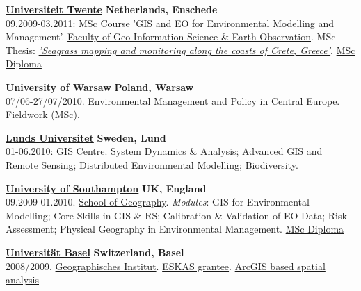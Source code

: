 \documentclass[10pt]{article}
\begin{document}
\href{http://www.utwente.nl/en}{\textbf{Universiteit Twente}} \hfill{\textbf{Netherlands, Enschede}}\\
09.2009-03.2011: MSc Course 'GIS and EO for Environmental Modelling and Management'.
\href{http://www.itc.nl/}{Faculty of Geo-Information Science \& Earth Observation}. MSc Thesis: \href{https://zenodo.org/record/2290319}{\emph{'Seagrass mapping and monitoring along the coasts of Crete, Greece'}}. \href{https://drive.google.com/file/d/15nvWlDbIy9DfKZHMaGbFfrdFQcHNEWZS/view?usp=sharing}{MSc Diploma}
\vspace{0.7em}

\href{http://www.uw.edu.pl/en/}{\textbf{University of Warsaw}} \hfill{\textbf{Poland, Warsaw}}\\
07/06-27/07/2010. Environmental Management and Policy in Central Europe. Fieldwork (MSc).
\vspace{0.7em}	

\href{http://www.lunduniversity.lu.se/}{\textbf{Lunds Universitet}}
 \hfill{\textbf{Sweden, Lund}}\\
01-06.2010: GIS Centre. System Dynamics \& Analysis; Advanced GIS and Remote Sensing; Distributed Environmental Modelling; Biodiversity.
\vspace{0.6em}

\href{http://www.southampton.ac.uk/}{\textbf{University of Southampton}} \hfill{\textbf{UK, England}}\\
 09.2009-01.2010. \href{http://www.southampton.ac.uk/geography/}{School of Geography}. \textit {Modules}: GIS for Environmental Modelling; Core Skills in GIS \& RS; Calibration \& Validation of EO Data; Risk Assessment; Physical Geography in Environmental Management. \href{https://drive.google.com/file/d/1I2DASP_waCDPbkQqRW479U-8ERztAKJP/view?usp=sharing}{MSc Diploma}\vspace{0.6em}

\href{http://www.unibas.ch/}{\textbf{Universit\"at Basel}} \hfill{\textbf{Switzerland, Basel}}\\
2008/2009. \href{http://www.physiogeo.unibas.ch/index.php?lang=en}{Geographisches Institut}. \href{https://drive.google.com/file/d/1IT99J8PqoiQZ5xbmlxdN5ty2eNkY6GIi/view?usp=sharing}{ESKAS grantee}. \href{https://www.researchgate.net/project/2008-2009-Switzerland-Basel-ArcGIS-Spatial-Analysis-to-Study-Gallocanta-Lake-Environment}{ArcGIS based spatial analysis}
\vspace{0.6em}
\end{document}
